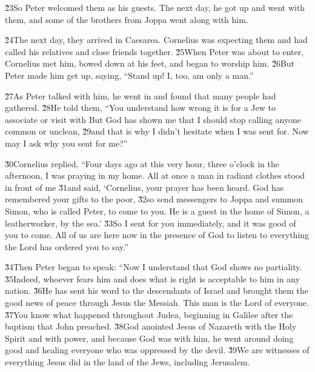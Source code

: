 \v{23}So Peter welcomed them as his guests. The next day, he got up and went with them, and some of the brothers from Joppa went along with him.

\v{24}The next day, they arrived in Caesarea. Cornelius was expecting them and had called his relatives and close friends together. \v{25}When Peter was about to enter, Cornelius met him, bowed down at his feet, and began to worship him. \v{26}But Peter made him get up, saying, ``Stand up! I, too, am only a man.''

\v{27}As Peter talked with him, he went in and found that many people had gathered. \v{28}He told them, ``You understand how wrong it is for a Jew to associate or visit with  But God has shown me that I should stop calling anyone common or unclean, \v{29}and that is why I didn't hesitate when I was sent for. Now may I ask why you sent for me?''

\v{30}Cornelius replied, ``Four days ago at this very hour, three o'clock in the afternoon, I was praying in my home. All at once a man in radiant clothes stood in front of me \v{31}and said, `Cornelius, your prayer has been heard. God has remembered your gifts to the poor, \v{32}so send messengers to Joppa and summon Simon, who is called Peter, to come to you. He is a guest in the home of Simon, a leatherworker, by the sea.' \v{33}So I sent for you immediately, and it was good of you to come. All of us are here now in the presence of God to listen to everything the Lord has ordered you to say.''

\v{34}Then Peter began to speak: ``Now I understand that God shows no partiality. \v{35}Indeed, whoever fears him and does what is right is acceptable to him in any nation. \v{36}He has sent his word to the descendants of Israel and brought them the good news of peace through Jesus the Messiah. This man is the Lord of everyone. \v{37}You know what happened throughout Judea, beginning in Galilee after the baptism that John preached. \v{38}God anointed Jesus of Nazareth with the Holy Spirit and with power, and because God was with him, he went around doing good and healing everyone who was oppressed by the devil. \v{39}We are witnesses of everything Jesus did in the land of the Jews, including Jerusalem.

